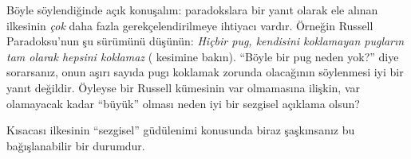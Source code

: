 Böyle söylendiğinde açık konuşalım: paradokslara bir yanıt olarak ele alınan
\limofsize{} ilkesinin \emph{çok} daha fazla gerekçelendirilmeye ihtiyacı
vardır. Örneğin Russell Paradoksu'nun şu sürümünü düşünün: \emph{Hiçbir pug,
kendisini koklamayan pugların tam olarak hepsini koklamaz}
( kesimine bakın). ``Böyle bir pug neden yok?''
diye sorarsanız, onun aşırı sayıda pugı koklamak zorunda olacağının söylenmesi
iyi bir yanıt değildir. Öyleyse bir Russell kümesinin var olmamasına ilişkin,
var olamayacak kadar ``büyük'' olması neden iyi bir sezgisel açıklama olsun?

Kısacası \limofsize{} ilkesinin ``sezgisel'' güdülenimi konusunda biraz
şaşkınsanız bu bağışlanabilir bir durumdur.

